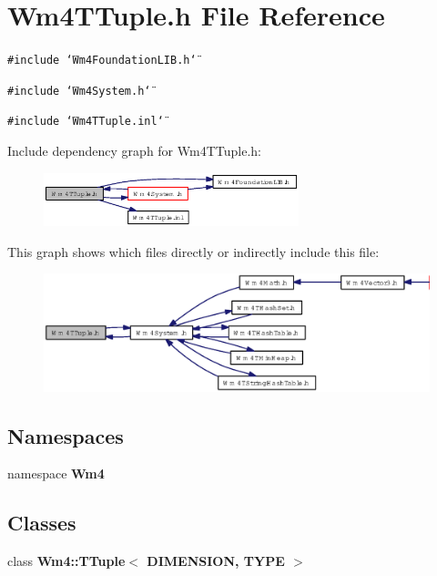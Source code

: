 \section{Wm4TTuple.h File Reference}
\label{Wm4TTuple_8h}
{\tt \#include \char`\"{}Wm4Foundation\-LIB.h\char`\"{}}\par
{\tt \#include \char`\"{}Wm4System.h\char`\"{}}\par
{\tt \#include \char`\"{}Wm4TTuple.inl\char`\"{}}\par


Include dependency graph for Wm4TTuple.h:\begin{figure}[H]
\begin{center}
\leavevmode
\includegraphics[width=210pt]{Wm4TTuple_8h__incl}
\end{center}
\end{figure}


This graph shows which files directly or indirectly include this file:\begin{figure}[H]
\begin{center}
\leavevmode
\includegraphics[width=345pt]{Wm4TTuple_8h__dep__incl}
\end{center}
\end{figure}
\subsection*{Namespaces}
\begin{CompactItemize}
\item 
namespace {\bf Wm4}
\end{CompactItemize}
\subsection*{Classes}
\begin{CompactItemize}
\item 
class {\bf Wm4::TTuple$<$ DIMENSION, TYPE $>$}
\end{CompactItemize}
